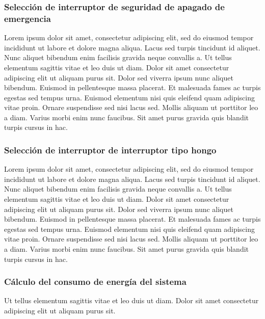 \subsubsection{Selección de interruptor de seguridad de apagado de emergencia}

Lorem ipsum dolor sit amet, consectetur adipiscing elit, sed do eiusmod tempor incididunt ut labore et dolore magna aliqua. Lacus sed turpis tincidunt id aliquet. Nunc aliquet bibendum enim facilisis gravida neque convallis a. Ut tellus elementum sagittis vitae et leo duis ut diam. Dolor sit amet consectetur adipiscing elit ut aliquam purus sit. Dolor sed viverra ipsum nunc aliquet bibendum. Euismod in pellentesque massa placerat. Et malesuada fames ac turpis egestas sed tempus urna. Euismod elementum nisi quis eleifend quam adipiscing vitae proin. Ornare suspendisse sed nisi lacus sed. Mollis aliquam ut porttitor leo a diam. Varius morbi enim nunc faucibus. Sit amet purus gravida quis blandit turpis cursus in hac.

\subsubsection{Selección de interruptor de interruptor tipo hongo}

Lorem ipsum dolor sit amet, consectetur adipiscing elit, sed do eiusmod tempor incididunt ut labore et dolore magna aliqua. Lacus sed turpis tincidunt id aliquet. Nunc aliquet bibendum enim facilisis gravida neque convallis a. Ut tellus elementum sagittis vitae et leo duis ut diam. Dolor sit amet consectetur adipiscing elit ut aliquam purus sit. Dolor sed viverra ipsum nunc aliquet bibendum. Euismod in pellentesque massa placerat. Et malesuada fames ac turpis egestas sed tempus urna. Euismod elementum nisi quis eleifend quam adipiscing vitae proin. Ornare suspendisse sed nisi lacus sed. Mollis aliquam ut porttitor leo a diam. Varius morbi enim nunc faucibus. Sit amet purus gravida quis blandit turpis cursus in hac.

\subsubsection{Cálculo del consumo de energía del sistema} 

Ut tellus elementum sagittis vitae et leo duis ut diam. Dolor sit amet consectetur adipiscing elit ut aliquam purus sit.


